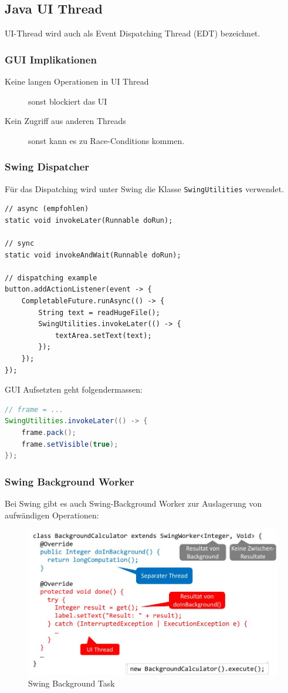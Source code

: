\subsection{Java UI Thread}

UI-Thread wird auch als Event Dispatching Thread (EDT) bezeichnet.

\subsubsection{GUI Implikationen}

\begin{description}
	\item[Keine langen Operationen in UI Thread] sonst blockiert das UI
	\item[Kein Zugriff aus anderen Threads] sonst kann es zu Race-Conditions kommen.
\end{description}



\subsubsection{Swing Dispatcher} 
Für das Dispatching wird unter Swing die Klasse \lstinline|SwingUtilities| verwendet. 

\begin{lstlisting}
// async (empfohlen)
static void invokeLater(Runnable doRun);

// sync
static void invokeAndWait(Runnable doRun);

// dispatching example
button.addActionListener(event -> {
	CompletableFuture.runAsync(() -> {
		String text = readHugeFile();
		SwingUtilities.invokeLater(() -> {
			textArea.setText(text);
		});
	});
});
\end{lstlisting}

GUI Aufsetzten geht folgendermassen:

\begin{lstlisting}[language=java]
// frame = ...
SwingUtilities.invokeLater(() -> {
	frame.pack();
	frame.setVisible(true);
});
\end{lstlisting}

\subsubsection{Swing Background Worker}
Bei Swing gibt es auch Swing-Background Worker zur Auslagerung von aufwändigen Operationen:
\begin{figure}[h]
	\centering
	\includegraphics[width=0.7\linewidth]{img/java_swing_background_task}
	\caption{Swing Background Task}
	\label{fig:javaswingbackgroundtask}
\end{figure}


